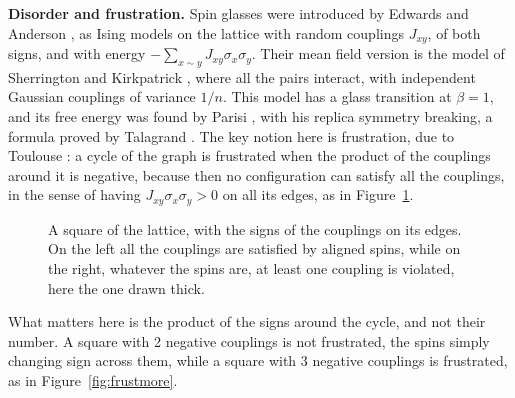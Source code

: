 \documentclass[11pt,a4paper]{article}
\theoremstyle{remark}
\begin{document}
\medskip

\noindent\textbf{Disorder and frustration.} Spin glasses were introduced by Edwards and Anderson \cite{ean}, as Ising models on the lattice with random couplings $J_{xy}$, of both signs, and with energy $-\sum_{x\sim y}J_{xy}\sigma_x\sigma_y$. Their mean field version is the model of Sherrington and Kirkpatrick \cite{ski}, where all the pairs interact, with independent Gaussian couplings of variance $1/n$. This model has a glass transition at $\beta=1$, and its free energy was found by Parisi \cite{par}, with his replica symmetry breaking, a formula proved by Talagrand \cite{tal}. The key notion here is frustration, due to Toulouse \cite{tou}: a cycle of the graph is frustrated when the product of the couplings around it is negative, because then no configuration can satisfy all the couplings, in the sense of having $J_{xy}\sigma_x\sigma_y>0$ on all its edges, as in Figure~\ref{fig:frustsquare}.

\begin{figure}[htb!]
\centering
{}
\caption{A square of the lattice, with the signs of the couplings on its edges. On the left all the couplings are satisfied by aligned spins, while on the right, whatever the spins are, at least one coupling is violated, here the one drawn thick.}\label{fig:frustsquare}
\end{figure}

What matters here is the product of the signs around the cycle, and not their number. A square with 2 negative couplings is not frustrated, the spins simply changing sign across them, while a square with 3 negative couplings is frustrated, as in Figure~\ref{fig:frustmore}.
\end{document}
